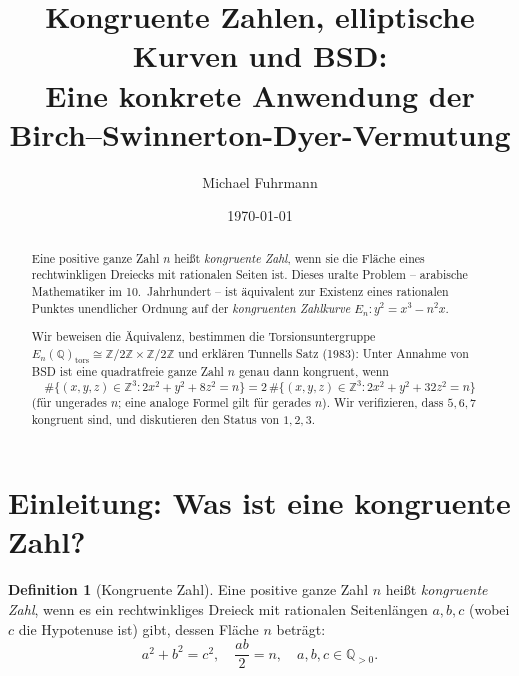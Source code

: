 \documentclass[12pt,a4paper]{amsart}
\theoremstyle{definition}
\newtheorem{definition}[theorem]{Definition}
\newcommand{\Z}{\mathbb{Z}}
\newcommand{\Q}{\mathbb{Q}}
\begin{document}

\title{Kongruente Zahlen, elliptische Kurven und BSD:\\
       Eine konkrete Anwendung der Birch--Swinnerton-Dyer-Vermutung}

\author{Michael Fuhrmann}
\address{Specialist Mathematics Project, Build 84}
\date{\today}

\begin{abstract}
Eine positive ganze Zahl $n$ hei\ss t \emph{kongruente Zahl}, wenn sie
die Fl\"ache eines rechtwinkligen Dreiecks mit rationalen Seiten ist.
Dieses uralte Problem -- arabische Mathematiker im 10.~Jahrhundert --
ist \"aquivalent zur Existenz eines rationalen Punktes unendlicher Ordnung
auf der \emph{kongruenten Zahlkurve}
$E_n: y^2 = x^3 - n^2 x$.

Wir beweisen die \"Aquivalenz, bestimmen die Torsionsuntergruppe
$E_n(\Q)_{\mathrm{tors}} \cong \Z/2\Z \times \Z/2\Z$
und erkl\"aren Tunnells Satz (1983):
Unter Annahme von BSD ist eine quadratfreie ganze Zahl $n$ genau dann
kongruent, wenn
\[
  \#\{(x,y,z) \in \Z^3 : 2x^2 + y^2 + 8z^2 = n\}
  = 2\,\#\{(x,y,z) \in \Z^3 : 2x^2 + y^2 + 32z^2 = n\}
\]
(f\"ur ungerades $n$; eine analoge Formel gilt f\"ur gerades $n$).
Wir verifizieren, dass $5, 6, 7$ kongruent sind,
und diskutieren den Status von $1, 2, 3$.
\end{abstract}

\maketitle
\tableofcontents

\section{Einleitung: Was ist eine kongruente Zahl?}

\begin{definition}[Kongruente Zahl]
\label{def:congruent}
Eine positive ganze Zahl $n$ hei\ss t \emph{kongruente Zahl}, wenn es ein
rechtwinkliges Dreieck mit rationalen Seitenl\"angen $a, b, c$
(wobei $c$ die Hypotenuse ist) gibt, dessen Fl\"ache $n$ betr\"agt:
\[
  a^2 + b^2 = c^2, \quad \frac{ab}{2} = n, \quad a, b, c \in \Q_{>0}.
\]
\end{definition}
\end{document}
